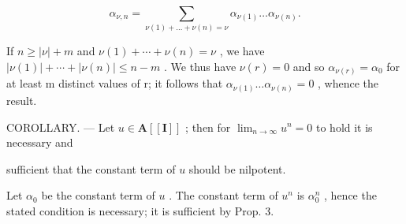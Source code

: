 \[
\alpha_ {\nu , n} = \sum_ {\nu (1) + \dots + \nu (n) = \nu} \alpha_ {\nu (1)} \dots \alpha_ {\nu (n)}.
\]

If \(n \geqslant |\nu| + m\) and \(\nu(1) + \cdots + \nu(n) = \nu\) , we have \(|\nu(1)| + \cdots + |\nu(n)| \leqslant n - m\) . We thus have \(\nu(r) = 0\) and so \(\alpha_{\nu(r)} = \alpha_0\) for at least m distinct values of r; it follows that \(\alpha_{\nu(1)} \ldots \alpha_{\nu(n)} = 0\) , whence the result.

COROLLARY. --- Let \(u \in \mathbf{A}[[\mathbf{I}]]\) ; then for \(\lim_{n \to \infty} u^n = 0\) to hold it is necessary and

sufficient that the constant term of \(u\) should be nilpotent.

Let \(\alpha_0\) be the constant term of \(u\) . The constant term of \(u^n\) is \(\alpha_0^n\) , hence the stated condition is necessary; it is sufficient by Prop. 3.
